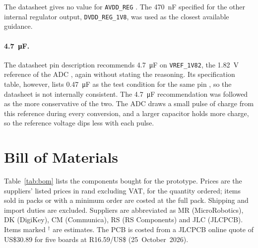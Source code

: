 The datasheet gives no value for \texttt{AVDD\_REG} \cite[p.~20]{ad5941_ds}.
The \SI{470}{\nano\farad} specified for the other internal regulator output,
\texttt{DVDD\_REG\_1V8}, was used as the closest available guidance.
 
\paragraph{\SI{4.7}{\micro\farad}.}
The datasheet pin description recommends \SI{4.7}{\micro\farad} on
\texttt{VREF\_1V82}, the \SI{1.82}{\volt} reference of the ADC
\cite[p.~19]{ad5941_ds}, again without stating the reasoning. Its
specification table, however, lists \SI{0.47}{\micro\farad} as the test
condition for the same pin \cite[p.~11]{ad5941_ds}, so the datasheet is not
internally consistent. The \SI{4.7}{\micro\farad} recommendation was followed
as the more conservative of the two. The ADC draws a small pulse of charge
from this reference during every conversion, and a larger capacitor holds more
charge, so the reference voltage dips less with each pulse.

\newpage

\section{Bill of Materials}
\label{app:bom}

Table~\ref{tab:bom} lists the components bought for the prototype. Prices are
the suppliers' listed prices in rand excluding VAT, for the quantity ordered;
items sold in packs or with a minimum order are costed at the full pack.
Shipping and import duties are excluded. Suppliers are abbreviated as
MR (MicroRobotics), DK (DigiKey), CM (Communica), RS (RS Components) and
JLC (JLCPCB). Items marked $^{\dagger}$ are estimates. The PCB is costed
from a JLCPCB online quote of US\$30.89 for five boards at R16.59/US\$
(25~October~2026).

